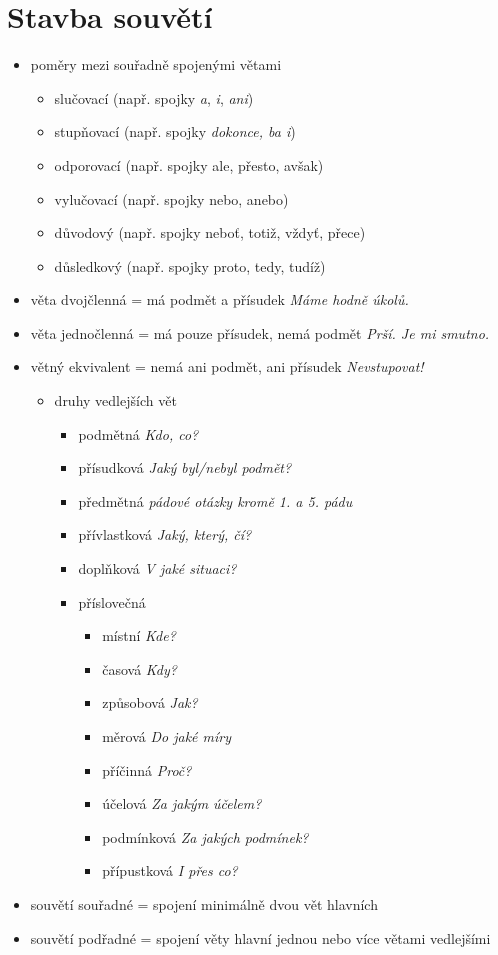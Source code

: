 \documentclass{memoir}
\begin{document}
\section*{Stavba souvětí}
\begin{itemize}
\item poměry mezi souřadně spojenými větami
    \begin{itemize}
    \item slučovací (např. spojky \textit{a}, \textit{i}, \textit{ani})
    \item stupňovací (např. spojky \textit{dokonce, ba i})
    \item odporovací (např. spojky ale, přesto, avšak)
    \item vylučovací (např. spojky nebo, anebo)
    \item důvodový (např. spojky neboť, totiž, vždyť, přece)
    \item důsledkový (např. spojky proto, tedy, tudíž)
    \end{itemize}
    \item věta dvojčlenná = má podmět a přísudek \hfill \textit{Máme hodně úkolů.}
   	\item věta jednočlenná = má pouze přísudek, nemá podmět \hfill \textit{Prší. Je mi smutno.}
   	\item větný ekvivalent = nemá ani podmět, ani přísudek \hfill \textit{Nevstupovat!}
   	\begin{itemize}
    \item druhy vedlejších vět
    \begin{itemize}
    \item podmětná \hfill \textit{Kdo, co?}
   	\item přísudková \hfill \textit{Jaký byl/nebyl podmět?}
   	\item předmětná \hfill \textit{pádové otázky kromě 1. a 5. pádu}
   	\item přívlastková \hfill \textit{Jaký, který, čí?}
   	\item doplňková \hfill \textit{V jaké situaci?}
   	\item příslovečná
    \begin{itemize}
    \item místní \hfill \textit{Kde?}
   	\item časová \hfill \textit{Kdy?}
   	\item způsobová \hfill \textit{Jak?}
   	\item měrová \hfill \textit{Do jaké míry}
   	\item příčinná \hfill \textit{Proč?}
   	\item účelová \hfill \textit{Za jakým účelem?}
   	\item podmínková \hfill \textit{Za jakých podmínek?}
   	\item přípustková \hfill \textit{I přes co?}
    \end{itemize}
    \end{itemize}
    \end{itemize}
   	\item souvětí souřadné = spojení minimálně dvou vět hlavních
   	\item souvětí podřadné = spojení věty hlavní jednou nebo více větami vedlejšími
\end{itemize}
\end{document}
